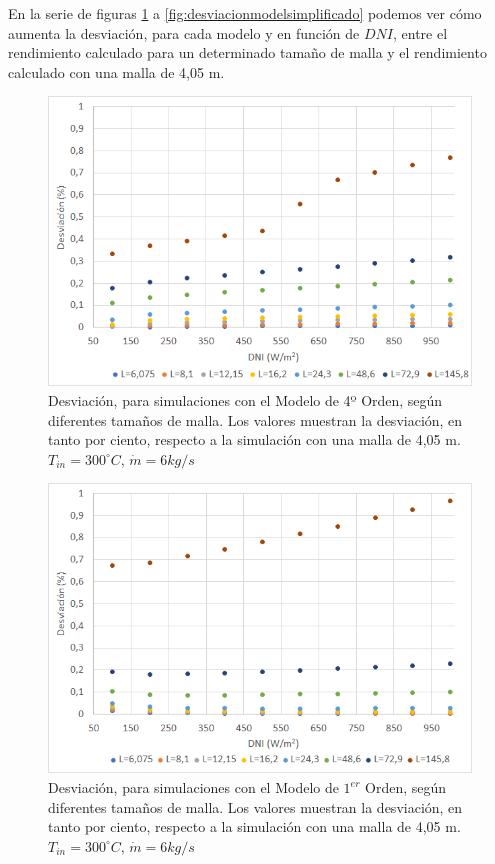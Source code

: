 En la serie de figuras \ref{fig:desviacionmodel4} a \ref{fig:desviacionmodelsimplificado} podemos ver cómo aumenta la desviación, para cada modelo y en función de $DNI$, entre el rendimiento calculado para un determinado tamaño de malla y el rendimiento calculado con una malla de 4,05 m.
\begin{figure}[H]
\includegraphics[width=0.9\linewidth]{images/desviacionmodel4malla.png}
\caption{Desviación, para simulaciones con el Modelo de 4º Orden, según diferentes tamaños de malla. Los valores muestran la desviación, en tanto por ciento, respecto a la simulación con una malla de 4,05 m. $T_{in}=300 ^\circ C$, $\dot m = 6 kg/s$} 
\label{fig:desviacionmodel4}
\end{figure}

\begin{figure}[H]
\includegraphics[width=0.9\linewidth]{images/desviacionmodel1malla.png}
\caption{Desviación, para simulaciones con el Modelo de $1^{er}$ Orden, según diferentes tamaños de malla. Los valores muestran la desviación, en tanto por ciento, respecto a la simulación con una malla de 4,05 m. $T_{in}=300 ^\circ C$, $\dot m = 6 kg/s$} 
\label{fig:desviacionmodel1}
\end{figure}

